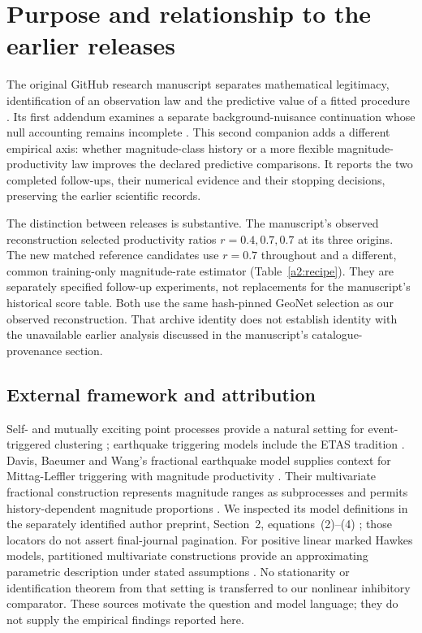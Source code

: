 \section{Purpose and relationship to the earlier releases}
\label{a2:purpose}

The original GitHub research manuscript separates mathematical legitimacy,
identification of an observation law and the predictive value of a fitted
procedure \citep{ProjectOriginal}. Its first addendum examines a separate
background-nuisance continuation whose null accounting remains incomplete
\citep{ProjectFirstAddendum}. This second companion adds a different empirical
axis: whether magnitude-class history or a more flexible magnitude-productivity
law improves the declared predictive comparisons. It reports the two completed
follow-ups, their numerical evidence and their stopping decisions, preserving
the earlier scientific records.

The distinction between releases is substantive. The manuscript's observed
reconstruction selected productivity ratios \(r=0.4,0.7,0.7\) at its three
origins. The new matched reference candidates use \(r=0.7\) throughout and a
different, common training-only magnitude-rate estimator
(Table~\ref{a2:recipe}). They are separately specified follow-up experiments,
not replacements for the manuscript's historical score table. Both use the
same hash-pinned GeoNet selection as our observed reconstruction. That archive
identity does not establish identity with the unavailable earlier analysis
discussed in the manuscript's catalogue-provenance section.



\subsection{External framework and attribution}

Self- and mutually exciting point processes provide a natural setting for
event-triggered clustering \citep{Hawkes1971}; earthquake triggering models
include the ETAS tradition \citep{Ogata1988}. Davis, Baeumer and Wang's
fractional earthquake model supplies context for Mittag-Leffler triggering
with magnitude productivity \citep{DavisBaeumerWang2024}. Their multivariate
fractional construction represents magnitude ranges as subprocesses and
permits history-dependent magnitude proportions
\citep{DavisBaeumerWang2026}. We inspected its model definitions in the
separately identified author preprint, Section~2, equations~(2)--(4)
\citep{DavisBaeumerWangPreprint2024}; those locators do not assert final-journal
pagination. For positive linear marked Hawkes models, partitioned multivariate
constructions provide an approximating parametric description under stated
assumptions \citep{DavisKresinBaeumerWang2026}. No stationarity or
identification theorem from that setting is transferred to our nonlinear
inhibitory comparator. These sources motivate the question and
model language; they do not supply the empirical findings reported here.

